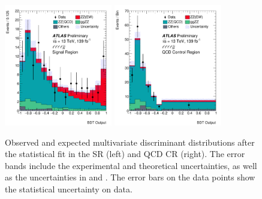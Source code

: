 \begin{figure}[!htbp]
\begin{center}
\includegraphics[width=0.42\textwidth]{figures/VBSZZ/fit/BDT_4l_SR_postFit.pdf}
\includegraphics[width=0.42\textwidth]{figures/VBSZZ/fit/BDT_4l_QCD_CR_postFit.pdf}
\end{center}
\caption{Observed and expected multivariate discriminant distributions after the statistical fit in the \llll SR (left) and QCD CR (right).
        The error bands include the experimental and theoretical uncertainties,
        as well as the uncertainties in \muEW and \muQCD.
        The error bars on the data points show the statistical uncertainty on data.
        }
\label{fig:fit_MD}
\end{figure}

